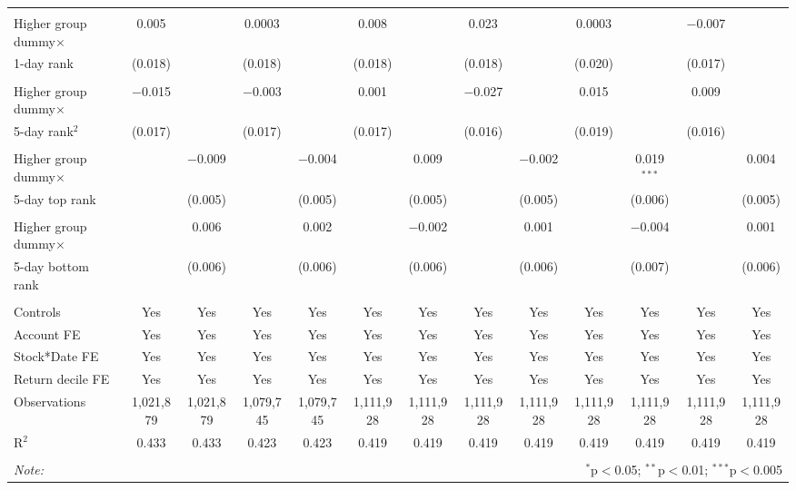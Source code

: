 \begin{tabular}{@{\extracolsep{2pt}}lcccccccccccc}
& & & & & & & & & & & & \\ 
Higher group dummy$\times$ & 0.005 &  & 0.0003 &  & 0.008 &  & 0.023 &  & 0.0003 &  & $-$0.007 &  \\ 
1-day rank & (0.018) &  & (0.018) &  & (0.018) &  & (0.018) &  & (0.020) &  & (0.017) &  \\ 
& & & & & & & & & & & & \\ 
Higher group dummy$\times$  & $-$0.015 &  & $-$0.003 &  & 0.001 &  & $-$0.027 &  & 0.015 &  & 0.009 &  \\ 
5-day rank$^2$& (0.017) &  & (0.017) &  & (0.017) &  & (0.016) &  & (0.019) &  & (0.016) &  \\ 
& & & & & & & & & & & & \\
Higher group dummy$\times$ &  & $-$0.009 &  & $-$0.004 &  & 0.009 &  & $-$0.002 &  & 0.019$^{***}$ &  & 0.004 \\ 
5-day top rank &  & (0.005) &  & (0.005) &  & (0.005) &  & (0.005) &  & (0.006) &  & (0.005) \\ 
& & & & & & & & & & & & \\   
Higher group dummy$\times$ &  & 0.006 &  & 0.002 &  & $-$0.002 &  & 0.001 &  & $-$0.004 &  & 0.001 \\ 
5-day bottom rank&  & (0.006) &  & (0.006) &  & (0.006) &  & (0.006) &  & (0.007) &  & (0.006) \\

\hline \\[-1.8ex] 
Controls & Yes & Yes & Yes & Yes & Yes & Yes  & Yes & Yes & Yes & Yes & Yes & Yes \\ 
Account FE & Yes & Yes & Yes & Yes & Yes & Yes  & Yes & Yes & Yes & Yes & Yes & Yes \\ 
Stock*Date FE & Yes & Yes & Yes & Yes & Yes & Yes  & Yes & Yes & Yes & Yes & Yes & Yes  \\ 
Return decile FE & Yes & Yes & Yes & Yes & Yes & Yes  & Yes & Yes & Yes & Yes & Yes & Yes\\ 
Observations & 1,021,879 & 1,021,879 & 1,079,745 & 1,079,745 & 1,111,928 & 1,111,928 & 1,111,928 & 1,111,928 & 1,111,928 & 1,111,928 & 1,111,928 & 1,111,928 \\ 

R$^{2}$ & 0.433 & 0.433 & 0.423 & 0.423 & 0.419 & 0.419 & 0.419 & 0.419 & 0.419 & 0.419 & 0.419 & 0.419 \\ 

\hline 
\hline \\[-1.8ex] 
\textit{Note:}  & \multicolumn{12}{r}{$^{*}$p$<$0.05; $^{**}$p$<$0.01; $^{***}$p$<$0.005} \\ 
\end{tabular} 

